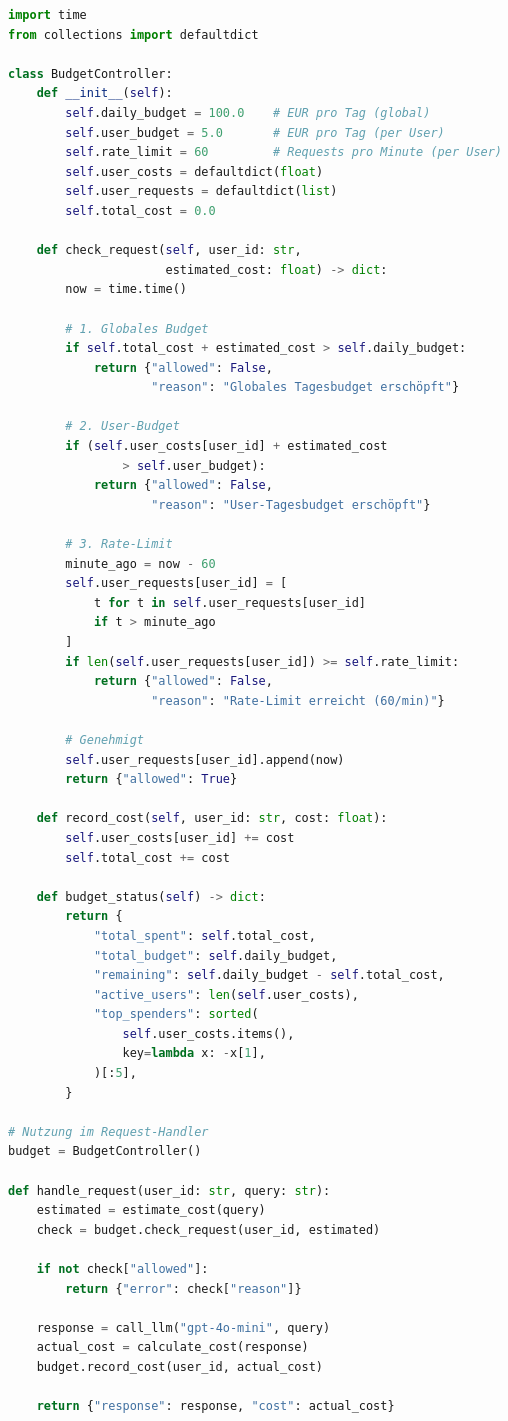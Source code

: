 \begin{lstlisting}[language=Python, caption=Budget-Controller mit Rate-Limiting]
import time
from collections import defaultdict

class BudgetController:
    def __init__(self):
        self.daily_budget = 100.0    # EUR pro Tag (global)
        self.user_budget = 5.0       # EUR pro Tag (per User)
        self.rate_limit = 60         # Requests pro Minute (per User)
        self.user_costs = defaultdict(float)
        self.user_requests = defaultdict(list)
        self.total_cost = 0.0

    def check_request(self, user_id: str,
                      estimated_cost: float) -> dict:
        now = time.time()

        # 1. Globales Budget
        if self.total_cost + estimated_cost > self.daily_budget:
            return {"allowed": False,
                    "reason": "Globales Tagesbudget erschöpft"}

        # 2. User-Budget
        if (self.user_costs[user_id] + estimated_cost
                > self.user_budget):
            return {"allowed": False,
                    "reason": "User-Tagesbudget erschöpft"}

        # 3. Rate-Limit
        minute_ago = now - 60
        self.user_requests[user_id] = [
            t for t in self.user_requests[user_id]
            if t > minute_ago
        ]
        if len(self.user_requests[user_id]) >= self.rate_limit:
            return {"allowed": False,
                    "reason": "Rate-Limit erreicht (60/min)"}

        # Genehmigt
        self.user_requests[user_id].append(now)
        return {"allowed": True}

    def record_cost(self, user_id: str, cost: float):
        self.user_costs[user_id] += cost
        self.total_cost += cost

    def budget_status(self) -> dict:
        return {
            "total_spent": self.total_cost,
            "total_budget": self.daily_budget,
            "remaining": self.daily_budget - self.total_cost,
            "active_users": len(self.user_costs),
            "top_spenders": sorted(
                self.user_costs.items(),
                key=lambda x: -x[1],
            )[:5],
        }

# Nutzung im Request-Handler
budget = BudgetController()

def handle_request(user_id: str, query: str):
    estimated = estimate_cost(query)
    check = budget.check_request(user_id, estimated)

    if not check["allowed"]:
        return {"error": check["reason"]}

    response = call_llm("gpt-4o-mini", query)
    actual_cost = calculate_cost(response)
    budget.record_cost(user_id, actual_cost)

    return {"response": response, "cost": actual_cost}
\end{lstlisting}

